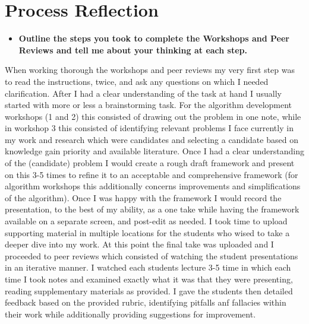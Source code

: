 \documentclass[12pt]{article}
\begin{document}
\section{Process Reflection}
\begin{itemize}
    \item \textbf{Outline the steps you took to complete the Workshops and Peer Reviews and tell me about your thinking at each step.}
\end{itemize}

When working thorough the workshops and peer reviews my very first step was to read the instructions, twice, and ask any questions on which I needed clarification. After I had a clear understanding of the task at hand I usually started with more or less a brainstorming task. For the algorithm development workshops (1 and 2) this consisted of drawing out the problem in one note, while in workshop 3 this consisted of identifying relevant problems I face currently in my work and research which were candidates and selecting a candidate based on knowledge gain priority and available literature. Once I had a clear understanding of the (candidate) problem I would create a rough draft framework and present on this 3-5 times to refine it to an acceptable and comprehensive framework (for algorithm workshops this additionally concerns improvements and simplifications of the algorithm). Once I was happy with the framework I would record the presentation, to the best of my ability, as a one take while having the framework available on a separate screen, and post-edit as needed. I took time to upload supporting material in multiple locations for the students who wised to take a deeper dive into my work. At this point the final take was uploaded and I proceeded to peer reviews which consisted of watching the student presentations in an iterative manner. I watched each students lecture 3-5 time in which each time I took notes and examined exactly what it was that they were presenting, reading supplementary materials as provided. I gave the students then detailed feedback based on the provided rubric, identifying pitfalls anf fallacies within their work while additionally providing suggestions for improvement.
\end{document}
